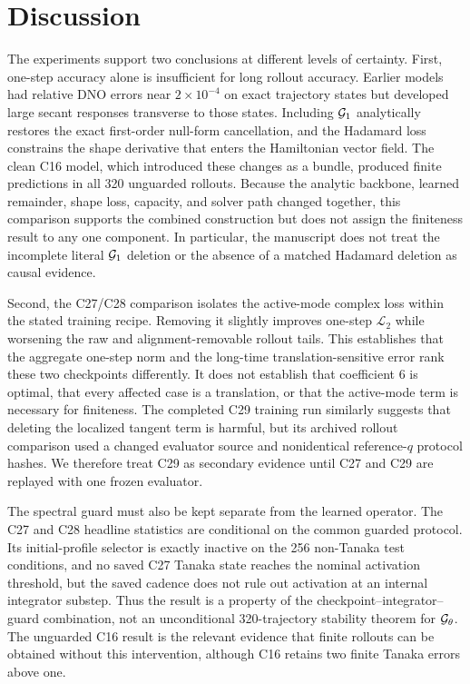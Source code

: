 \section{Discussion}
\label{sec:discussion}

The experiments support two conclusions at different levels of certainty.
First, one-step accuracy alone is insufficient for long rollout accuracy.
Earlier models had relative DNO errors near $2\times10^{-4}$ on exact
trajectory states but developed large secant responses transverse to those
states.  Including $\mathcal{G}_1$ analytically restores the exact first-order
null-form cancellation, and the Hadamard loss constrains the shape derivative
that enters the Hamiltonian vector field.  The clean C16 model, which
introduced these changes as a
bundle, produced finite predictions in all 320 unguarded rollouts.  Because
the analytic backbone, learned remainder, shape loss, capacity, and solver
path changed together, this comparison supports the combined construction but
does not assign the finiteness result to any one component.  In particular,
the manuscript does not treat the incomplete literal $\mathcal{G}_1$ deletion or the
absence of a matched Hadamard deletion as causal evidence.

Second, the C27/C28 comparison isolates the active-mode complex loss within
the stated training recipe.  Removing it slightly improves one-step
$\mathcal L_2$ while worsening the raw and alignment-removable rollout tails.
This establishes that the aggregate one-step norm and the long-time
translation-sensitive error rank these two checkpoints differently.  It does
not establish that coefficient 6 is optimal, that every affected case is a
translation, or that the active-mode term is necessary for finiteness.  The
completed C29 training run similarly suggests that deleting the localized
tangent term is harmful, but its archived rollout comparison used a changed
evaluator source and nonidentical reference-$q$ protocol hashes.  We therefore
treat C29 as secondary evidence until C27 and C29 are replayed with one frozen
evaluator.

The spectral guard must also be kept separate from the learned operator.  The
C27 and C28 headline statistics are conditional on the common guarded
protocol.  Its initial-profile selector is exactly inactive on the 256
non-Tanaka test conditions, and no saved C27 Tanaka state reaches the nominal
activation threshold, but the saved cadence does not rule out activation at
an internal integrator substep.  Thus the result is a property of the
checkpoint--integrator--guard combination, not an unconditional
320-trajectory stability theorem for $\mathcal{G}_{\theta}$.  The unguarded C16 result is
the relevant evidence that finite rollouts can be obtained without this
intervention, although C16 retains two finite Tanaka errors above one.

